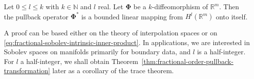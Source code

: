 \begin{Theorem}
\label{thm:fractional-order-pullback-transformation}
Let $0\leq l\leq k$ with $k\in\mathbb{N}$ and $l$ real. Let $\bm{\Phi}$ be a $k$-diffeomorphism of $\mathbb{R}^m$. Then the pullback operator $\bm{\Phi}^*$ is a bounded linear mapping from $H^l(\mathbb{R}^m)$ onto itself.
\end{Theorem}

A proof can be based either on the theory of interpolation spaces or on \eqref{eq:fractional-sobolev-intrinsic-inner-product}. In applications, we are interested in Sobolev spaces on manifolds primarily for boundary data, and $l$ is a half-integer. For $l$ a half-integer, we shall obtain Theorem~\ref{thm:fractional-order-pullback-transformation} later as a corollary of the trace theorem.
